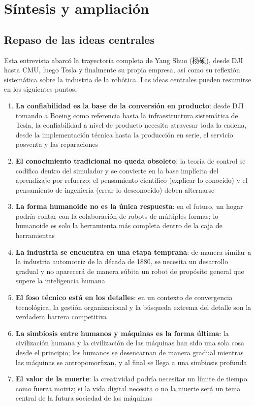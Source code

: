 \section{Síntesis y ampliación}

\subsection{Repaso de las ideas centrales}

Esta entrevista abarcó la trayectoria completa de Yang Shuo (杨硕), desde DJI hasta CMU, luego Tesla y finalmente su propia empresa, así como su reflexión sistemática sobre la industria de la robótica. Las ideas centrales pueden resumirse en los siguientes puntos:

\begin{enumerate}
    \item \textbf{La confiabilidad es la base de la conversión en producto}: desde DJI tomando a Boeing como referencia hasta la infraestructura sistemática de Tesla, la confiabilidad a nivel de producto necesita atravesar toda la cadena, desde la implementación técnica hasta la producción en serie, el servicio posventa y las reparaciones
    \item \textbf{El conocimiento tradicional no queda obsoleto}: la teoría de control se codifica dentro del simulador y se convierte en la base implícita del aprendizaje por refuerzo; el pensamiento científico (explicar lo conocido) y el pensamiento de ingeniería (crear lo desconocido) deben alternarse
    \item \textbf{La forma humanoide no es la única respuesta}: en el futuro, un hogar podría contar con la colaboración de robots de múltiples formas; lo humanoide es solo la herramienta más completa dentro de la caja de herramientas
    \item \textbf{La industria se encuentra en una etapa temprana}: de manera similar a la industria automotriz de la década de 1880, se necesita un desarrollo gradual y no aparecerá de manera súbita un robot de propósito general que supere la inteligencia humana
    \item \textbf{El foso técnico está en los detalles}: en un contexto de convergencia tecnológica, la gestión organizacional y la búsqueda extrema del detalle son la verdadera barrera competitiva
    \item \textbf{La simbiosis entre humanos y máquinas es la forma última}: la civilización humana y la civilización de las máquinas han sido una sola cosa desde el principio; los humanos se desencarnan de manera gradual mientras las máquinas se antropomorfizan, y al final se llega a una simbiosis profunda
    \item \textbf{El valor de la muerte}: la creatividad podría necesitar un límite de tiempo como fuerza motriz; si la vida digital necesita o no la muerte será un tema central de la futura sociedad de las máquinas
\end{enumerate}

